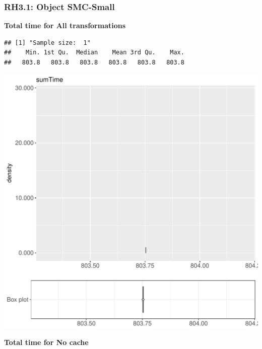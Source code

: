 \documentclass{article}\usepackage[]{graphicx}\usepackage[]{color}
\makeatletter
\def\maxwidth{ %
  \ifdim\Gin@nat@width>\linewidth
    \linewidth
  \else
    \Gin@nat@width
  \fi
}
\newenvironment{kframe}{%
 \def\at@end@of@kframe{}%
 \ifinner\ifhmode%
  \def\at@end@of@kframe{\end{minipage}}%
  \begin{minipage}{\columnwidth}%
 \fi\fi%
 \def\FrameCommand##1{\hskip\@totalleftmargin \hskip-\fboxsep
 \colorbox{shadecolor}{##1}\hskip-\fboxsep
     \hskip-\linewidth \hskip-\@totalleftmargin \hskip\columnwidth}%
 \MakeFramed {\advance\hsize-\width
   \@totalleftmargin\z@ \linewidth\hsize
   \@setminipage}}%
 {\par\unskip\endMakeFramed%
 \at@end@of@kframe}
\newenvironment{knitrout}{}{} %
\makeatother
\begin{document}
\subsubsection{RH3.1: Object SMC-Small}

 \textbf{Total time for All transformations}
\begin{knitrout}
\color{fgcolor}\begin{kframe}
\begin{verbatim}
## [1] "Sample size:  1"
##    Min. 1st Qu.  Median    Mean 3rd Qu.    Max. 
##   803.8   803.8   803.8   803.8   803.8   803.8
\end{verbatim}


{\ttfamily\noindent\bfseries{}}\end{kframe}
\includegraphics[width=\maxwidth]{figure/RH3_cashew_small-1} 

\end{knitrout}
 \textbf{Total time for No cache}
\end{document}
